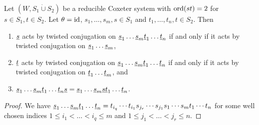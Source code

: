 \begin{lemm}
	Let $(W, S_1 \dot \cup S_2)$ be a reducible Coxeter system with $\operatorname{ord}(st) = 2$ for $s \in S_1, t \in S_2$. Let $\theta = \operatorname{id}$, $s_1,\ldots,s_m,s \in S_1$ and $t_1,\ldots,t_n,t \in S_2$. Then

	\begin{enumerate}
		\item $\underline{s}$ acts by twisted conjugation on $\underline{s}_1 \ldots \underline{s}_m \underline{t}_1 \ldots \underline{t}_n$ if and only if it acts by twisted conjugation on $\underline{s}_1 \ldots \underline{s}_m$,
		\item $\underline{t}$ acts by twisted conjugation on $\underline{s}_1 \ldots \underline{s}_m \underline{t}_1 \ldots \underline{t}_n$ if and only if it acts by twisted conjugation on $\underline{t}_1 \ldots \underline{t}_m$, and
		\item $\underline{s}_1 \ldots \underline{s}_m \underline{t}_1 \ldots \underline{t}_n \underline{s} = \underline{s}_1 \ldots \underline{s}_m \underline{s} \underline{t}_1 \ldots \underline{t}_n$.
	\end{enumerate}

	\begin{proof}
		We have $\underline{s}_1 \ldots \underline{s}_m \underline{t}_1 \ldots \underline{t}_n = t_{i_q} \cdots t_{i_1} s_{j_r} \cdots s_{j_1} s_1 \cdots s_m t_1 \cdots t_n$ for some well chosen indices $1 \leq i_1 < \ldots < i_q \leq m$ and $1 \leq j_1 < \ldots < j_r \leq n$.


\end{proof}
\end{lemm}
